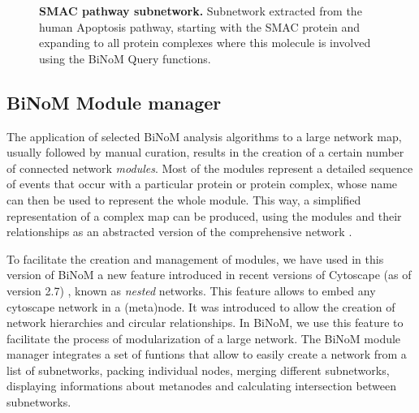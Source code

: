 \documentclass[10pt]{bmc_article}
\newenvironment{bmcformat}{\baselineskip20pt\sloppy\setboolean{publ}{false}}{\baselineskip20pt\sloppy}
\begin{document}
\begin{bmcformat}
\begin{figure}[h]
 \caption{\label{smaccomplexes}  \textbf{SMAC pathway subnetwork.}
      Subnetwork extracted from the human Apoptosis pathway, starting with the
SMAC protein and expanding to all protein complexes where this
molecule is involved using the BiNoM Query functions.}
\end{figure}


\subsection*{BiNoM Module manager}
The application of selected BiNoM analysis algorithms to a large network map,
usually followed by manual curation, results in the creation of a certain number
of connected network \emph{modules}. Most of the modules represent a detailed
sequence of events that occur with a particular protein or protein complex,
whose name can then be used to represent the whole module. This way, a
simplified representation of a complex map can be produced, using the modules
and their relationships as an abstracted version of the comprehensive network
\cite{calzone2008comprehensive}.

To facilitate the creation and management of modules, we have used in this
version of BiNoM a new feature introduced in recent versions of Cytoscape (as of
version 2.7) \cite{cline2007integration}, known as \emph{nested} networks. This
feature allows to embed any cytoscape network in a (meta)node. It was
introduced to allow the creation of network hierarchies and circular
relationships. In BiNoM, we use this feature to facilitate the process of
modularization of a large network. The BiNoM module manager integrates a set of
funtions that allow to easily create a network from a list of subnetworks,
packing individual nodes, merging different subnetworks, displaying informations
about metanodes and calculating intersection between subnetworks.


\end{bmcformat}
\end{document}
